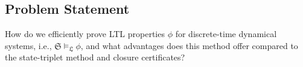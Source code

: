 \documentclass[acmlarge]{acmart}
\begin{document}




\subsection{Problem Statement}
 How do we efficiently prove LTL properties $\phi$ for discrete-time dynamical systems, i.e., $\mathfrak{S} \models_{\mathfrak{L}} \phi$, and what advantages does this method offer compared to the state-triplet method and closure certificates?
 
\end{document}
